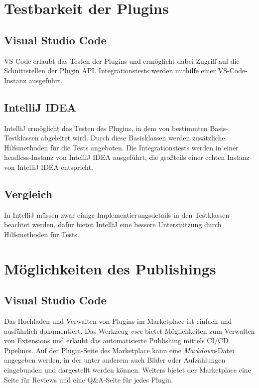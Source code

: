 \section{Testbarkeit der Plugins}
\label{sec:Vergleich_Testbarkeit}

\subsection{Visual Studio Code}

VS Code erlaubt das Testen der Plugins und ermöglicht
dabei Zugriff auf die Schnittstellen der Plugin API.
Integrationstests werden mithilfe einer VS-Code-Instanz ausgeführt.

\subsection{IntelliJ IDEA}

IntelliJ ermöglicht das Testen des Plugins, in dem
von bestimmten Basis-Testklassen abgeleitet wird. Durch diese
Basisklassen werden zusätzliche Hilfsmethoden für die Tests
angeboten. Die Integrationstests werden in einer
headless-Instanz von IntelliJ IDEA ausgeführt, die großteils
einer echten Instanz von IntelliJ IDEA entspricht.

\subsection{Vergleich}

In IntelliJ müssen zwar einige Implementierungsdetails in den Testklassen
beachtet werden, dafür bietet IntelliJ eine bessere Unterstützung
durch Hilfsmethoden für Tests.


\section{Möglichkeiten des Publishings}
\label{sec:Vergleich_Publishing}

\subsection{Visual Studio Code}

Das Hochladen und Verwalten von Plugins im Marketplace ist
einfach und ausführlich dokumentiert. Das Werkzeug \emph{vsce}
bietet Möglichkeiten zum Verwalten von Extensions und 
erlaubt das automatisierte Publishing mittels CI/CD Pipelines.
Auf der Plugin-Seite des Marketplace kann eine \emph{Markdown}-Datei
angegeben werden, in der unter anderem auch Bilder oder Aufzählungen 
eingebunden und dargestellt werden können. 
Weiters bietet der Marketplace eine Seite für Reviews
und eine Q\&A-Seite für jedes Plugin.

